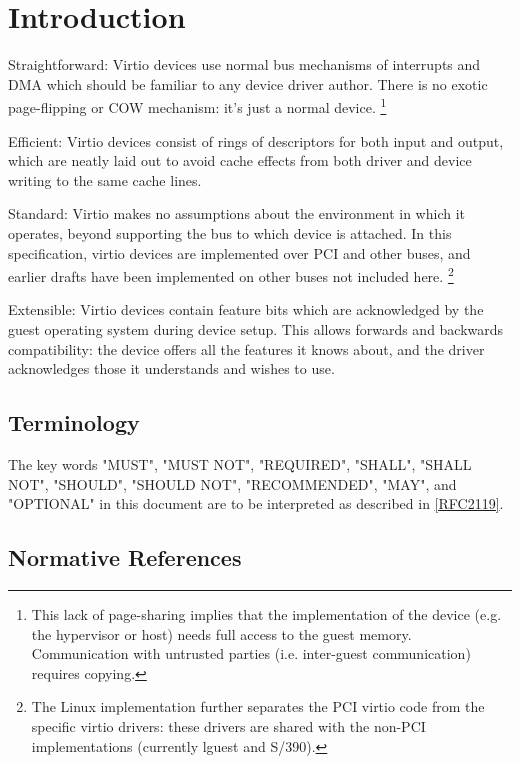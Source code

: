 \chapter{Introduction}



  Straightforward: Virtio devices use normal bus mechanisms of
  interrupts and DMA which should be familiar to any device driver
  author. There is no exotic page-flipping or COW mechanism: it's just
  a normal device.
\footnote{This lack of page-sharing implies that the implementation of the
device (e.g. the hypervisor or host) needs full access to the
guest memory. Communication with untrusted parties (i.e.
inter-guest communication) requires copying.
}

  Efficient: Virtio devices consist of rings of descriptors
  for both input and output, which are neatly laid out to avoid cache
  effects from both driver and device writing to the same cache
  lines.

  Standard: Virtio makes no assumptions about the environment in which
  it operates, beyond supporting the bus to which device is attached.
  In this specification, virtio
  devices are implemented over PCI and other buses, and earlier drafts
  have been implemented on other buses not included here.
\footnote{The Linux implementation further separates the PCI virtio code
from the specific virtio drivers: these drivers are shared with
the non-PCI implementations (currently lguest and S/390).
}

  Extensible: Virtio devices contain feature bits which are
  acknowledged by the guest operating system during device setup.
  This allows forwards and backwards compatibility: the device
  offers all the features it knows about, and the driver
  acknowledges those it understands and wishes to use.

\section{Terminology}\label{Terminology}

The key words "MUST", "MUST NOT", "REQUIRED", "SHALL", "SHALL NOT", "SHOULD", "SHOULD NOT", "RECOMMENDED", "MAY", and "OPTIONAL" in this document are to be interpreted as described in \hyperref[intro:rfc2119]{[RFC2119]}.

\section{Normative References}

